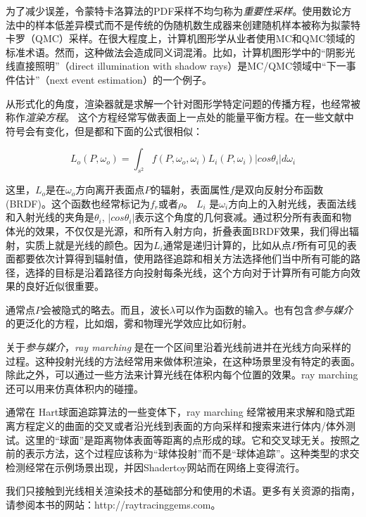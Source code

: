 \documentclass[12pt]{article}
\begin{document}
为了减少误差，令蒙特卡洛算法的PDF采样不均匀称为\textit{重要性采样}。使用数论方法中的样本低差异模式而不是传统的伪随机数生成器来创建随机样本被称为拟蒙特卡罗（QMC）采样。在很大程度上，计算机图形学从业者使用MC和QMC领域的标准术语。然而，这种做法会造成同义词混淆。比如，计算机图形学中的“阴影光线直接照明”（direct illumination with shadow rays）是MC/QMC领域中“下一事件估计”（next event estimation）的一个例子。

从形式化的角度，渲染器就是求解一个针对图形学特定问题的传播方程，也经常被称作\textit{渲染方程}。 这个方程经常写做表面上一点处的能量平衡方程。在一些文献中符号会有变化，但是都和下面的公式很相似：

\begin{equation}
L_o(P, \omega_o) = \int_{s^2} f(P, \omega_o,\omega_i)L_i(P,\omega_i) |cos\theta_i|d\omega_i
\end{equation}

这里，$L_o$是在$\omega_o$方向离开表面点$P$的辐射，表面属性$f$是双向反射分布函数(BRDF)。这个函数也经常标记为$f_r$或者$\rho$。 $L_i$ 是$\omega_i$方向上的入射光线，表面法线和入射光线的夹角是$\theta_i$, $|cos \theta_i|$表示这个角度的几何衰减。通过积分所有表面和物体光的效果，不仅仅是光源，和所有入射方向，折叠表面BRDF效果，我们得出辐射，实质上就是光线的颜色。因为$L_i$通常是递归计算的，比如从点$P$所有可见的表面都要依次计算得到辐射值，使用路径追踪和相关方法选择他们当中所有可能的路径，选择的目标是沿着路径方向投射每条光线，这个方向对于计算所有可能方向效果的良好近似很重要。

通常点$P$会被隐式的略去。而且，波长$\lambda$可以作为函数的输入。也有包含\textit{参与媒介}的更泛化的方程，比如烟，雾和物理光学效应比如衍射。

关于\textit{参与媒介}，\textit{ray marching} 是在一个区间里沿着光线前进并在光线方向采样的过程。这种投射光线的方法经常用来做体积渲染，在这种场景里没有特定的表面。除此之外，可以通过一些方法来计算光线在体积内每个位置的效果。ray marching还可以用来仿真体积内的碰撞。

通常在 Hart球面追踪算法\cite{Hart1996}的一些变体下，ray marching 经常被用来求解和隐式距离方程定义的曲面的交叉或者沿光线到表面的方向采样和搜索来进行体内/体外测试。这里的“球面”是距离物体表面等距离的点形成的球。它和交叉球无关。按照之前的表示方法，这个过程应该称为“球体投射”而不是“球体追踪”。这种类型的求交检测经常在示例场景出现，并因Shadertoy网站而在网络上变得流行。

我们只接触到光线相关渲染技术的基础部分和使用的术语。更多有关资源的指南，请参阅本书的网站：http://raytracinggems.com。
 


\end{document}
